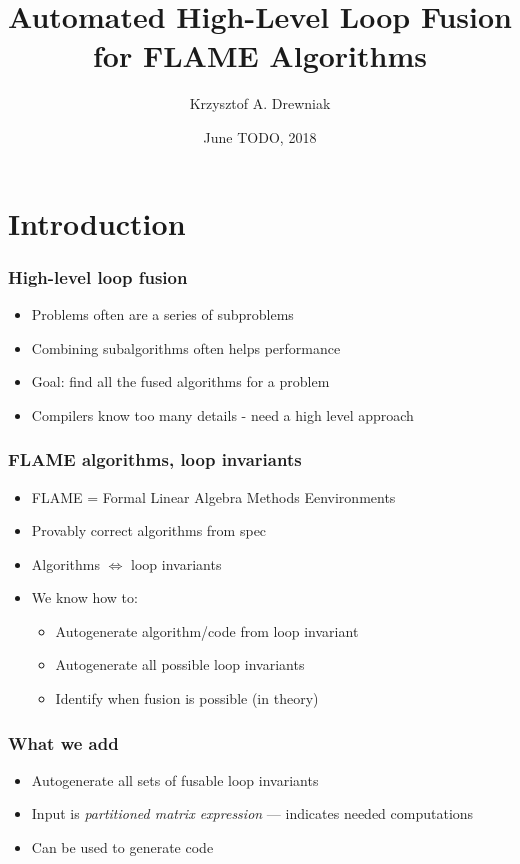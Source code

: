 \documentclass{beamer}
\title[Loop fusion]{Automated High-Level Loop Fusion for FLAME Algorithms}
\author[Drewniak]{Krzysztof A. Drewniak}
\institute[CMU]{Carnegie Mellon University}
\date[]{June TODO, 2018}
\begin{document}
\begin{frame}[plain]
  \titlepage{}
\end{frame}

\section{Introduction}

\begin{frame}
  \frametitle{High-level loop fusion}
  \begin{itemize}
  \item Problems often are a series of subproblems
  \item Combining subalgorithms often helps performance
  \item Goal: find all the fused algorithms for a problem
  \item Compilers know too many details - need a high level approach
  \end{itemize}
\end{frame}

\begin{frame}
  \frametitle{FLAME algorithms, loop invariants}
  \begin{itemize}
  \item FLAME = Formal Linear Algebra Methods Eenvironments
  \item Provably correct algorithms from spec
  \item Algorithms $\Leftrightarrow$ loop invariants
  \item We know how to:
    \begin{itemize}
    \item Autogenerate algorithm/code from loop invariant
    \item Autogenerate all possible loop invariants
    \item Identify when fusion is possible (in theory)
    \end{itemize}
  \end{itemize}
\end{frame}

\begin{frame}
  \frametitle{What we add}
  \begin{itemize}
  \item Autogenerate all sets of fusable loop invariants
  \item Input is \emph{partitioned matrix expression} --- indicates needed computations
  \item Can be used to generate code
  \end{itemize}
\end{frame}
\end{document}
